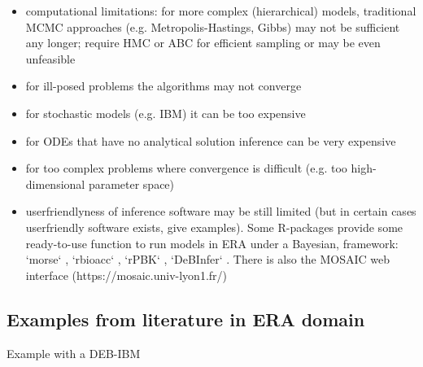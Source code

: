 \documentclass [english,11pt]{article} %
\begin{document}
\begin{itemize}
\item computational limitations: for more complex (hierarchical) models, traditional MCMC approaches (e.g. Metropolis-Hastings, Gibbs) may not be sufficient any longer; require HMC or ABC \citep{Beaumont2010, Csillery2010} for efficient sampling or may be even unfeasible
\item for ill-posed problems the algorithms may not converge
\item for stochastic models (e.g. IBM) it can be too expensive
\item for ODEs that have no analytical solution inference can be very expensive
\item for too complex problems where convergence is difficult (e.g. too high-dimensional parameter space)
\item userfriendlyness of inference software may be still limited (but in certain cases userfriendly software exists, give examples). Some R-packages provide some ready-to-use function to run models in ERA under a Bayesian, framework: `morse` \citep{Baudrot2021}, `rbioacc` \citep{rbioacc2021}, `rPBK` \citep{Charles2022}, `DeBInfer` \citep{Boersch-Supan2017}. There is also the MOSAIC web interface (https://mosaic.univ-lyon1.fr/)


\end{itemize}




\subsection*{Examples from literature in ERA domain}
Example with a DEB-IBM \cite{Hansul2021}
\end{document}
